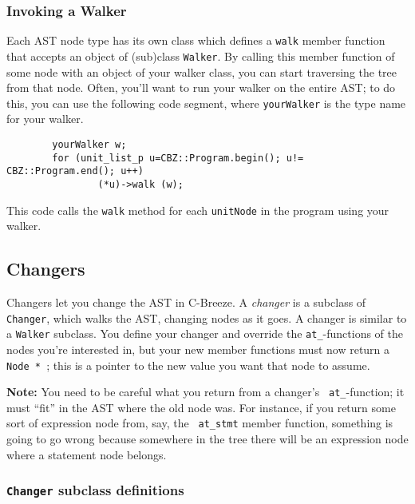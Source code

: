 \documentclass[10pt]{article}
\begin{document}
\subsubsection{Invoking a Walker}

Each AST node type has its own class which defines a {\tt walk} member
function that accepts an object of (sub)class {\tt Walker}.  By calling this
member function of some node with an object of your walker class, you can
start traversing the tree from that node.  Often, you'll want to run your
walker on the entire AST; to do this, you can use the following code segment,
where {\tt yourWalker} is the type name for your walker.

\begin{small}
\begin{verbatim}
        yourWalker w;
        for (unit_list_p u=CBZ::Program.begin(); u!= CBZ::Program.end(); u++)
                (*u)->walk (w);
\end{verbatim}
\end{small}

\noindent
This code calls the {\tt walk} method for each {\tt unitNode} in the program 
using your walker.  



\subsection{Changers}

Changers let you change the AST in C-Breeze.  A {\em changer} is a subclass
of {\tt Changer}, which walks the AST, changing nodes as it goes.  A changer
is similar to a {\tt Walker} subclass.  You define your changer and override
the {\tt at\_}-functions of the nodes you're interested in, but your new
member functions must now return a {\tt Node * }; this is a pointer to the
new value you want that node to assume. 

{\bf Note:} You need to be careful what you return from a changer's {\tt
at\_}-function; it must ``fit'' in the AST where the old node was.  For
instance, if you return some sort of expression node from, say, the {\tt
at\_stmt} member function, something is going to go wrong because somewhere
in the tree there will be an expression node where a statement node belongs.

\subsubsection{{\tt Changer} subclass definitions}
\end{document}
